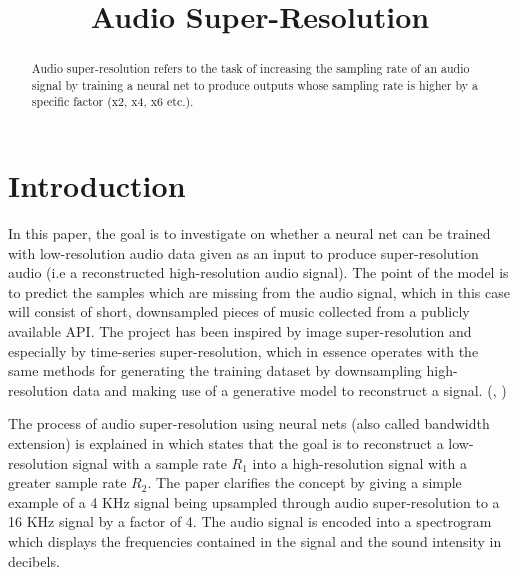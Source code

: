 \documentclass[conference]{IEEEtran}
\begin{document}
\title{Audio Super-Resolution\\
}

\author{
}

\maketitle

\begin{abstract}
Audio super-resolution refers to the task of increasing the sampling rate of an audio signal by training a neural net to produce outputs whose sampling rate is higher by a specific factor (x2, x4, x6 etc.).
\end{abstract}

\section{Introduction}
	In this paper, the goal is to investigate on whether a neural net can be trained with low-resolution audio data given as an input to produce super-resolution audio (i.e a reconstructed high-resolution audio signal). The point of the model is to predict the samples which are missing from the audio signal, which in this case will consist of short, downsampled pieces of music collected from a publicly available API. The project has been inspired by image super-resolution and especially by time-series super-resolution, which in essence operates with the same methods for generating the training dataset by downsampling high-resolution data and making use of a generative model to reconstruct a signal. (\textcite{kuleshov2017audio}, \textcite{hetherly2017audio})

	The process of audio super-resolution using neural nets (also called bandwidth extension) is explained in \textcite{kuleshov2017audio} which states that the goal is to reconstruct a low-resolution signal with a sample rate $ R_{1} $ into a high-resolution signal with a greater sample rate $ R_{2} $. The paper clarifies the concept by giving a simple example of a 4 KHz signal being upsampled through audio super-resolution to a 16 KHz signal by a factor of 4. The audio signal is encoded into a spectrogram which displays the frequencies contained in the signal and the sound intensity in decibels. 
\end{document}
